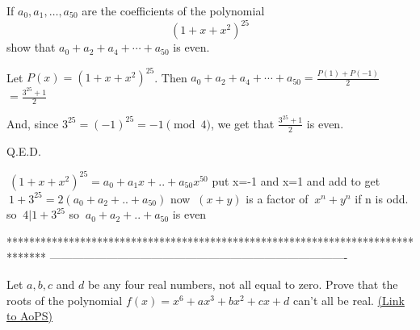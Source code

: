 \begin{solution}
	\begin{tcolorbox}If $ a_0,a_1,\dots,a_{50}$ are the coefficients of the polynomial
\[ \left(1 + x + x^2\right)^{25}\]
show that $ a_0 + a_2 + a_4 + \cdots + a_{50}$ is even.\end{tcolorbox}

Let $ P(x)=\left(1 + x + x^2\right)^{25}$. Then $ a_0 + a_2 + a_4 + \cdots + a_{50}=\frac{P(1)+P(-1)}{2}$ $ =\frac{3^{25}+1}{2}$

And, since $ 3^{25}=(-1)^{25}=-1\pmod 4$, we get that  $ \frac{3^{25}+1}{2}$ is even.

Q.E.D.
\end{solution}



\begin{solution}[by \href{https://artofproblemsolving.com/community/user/6927}{Hong Quy}]
	$a_0+a_2+a_4+\cdots+a_{50}= \frac{P(1)+P(-1)}{2} =\frac{3^{25}+1}}{2}$
Because of, $ 3^{25}+1 $ device by $4$. Therefore, $a_0+a_2+a_4+\cdots+a_{50}$ is even.
\end{solution}



\begin{solution}
	$\ (1+x+x^{2})^{25}=a_{0}+a_{1}x+..+a_{50}x^{50}$
put x=-1 and x=1 and add to get
$\ 1+3^{25}=2(a_{0}+a_{2}+..+a_{50})$
now $ \ (x+y) $ is a factor of $\ x^{n}+y^{n} $ if n is odd.
so $\ 4| 1+3^{25} $
so $\ a_{0}+a_{2}+..+a_{50} $ is even
\end{solution}
*******************************************************************************
-------------------------------------------------------------------------------

\begin{problem}
	Let $ a,b,c$ and $ d$ be any four real numbers, not all equal to zero. Prove that the roots of the polynomial $ f(x) = x^{6} + ax^{3} + bx^{2} + cx + d$ can't all be real.
	\flushright \href{https://artofproblemsolving.com/community/c6h298781}{(Link to AoPS)}
\end{problem}



